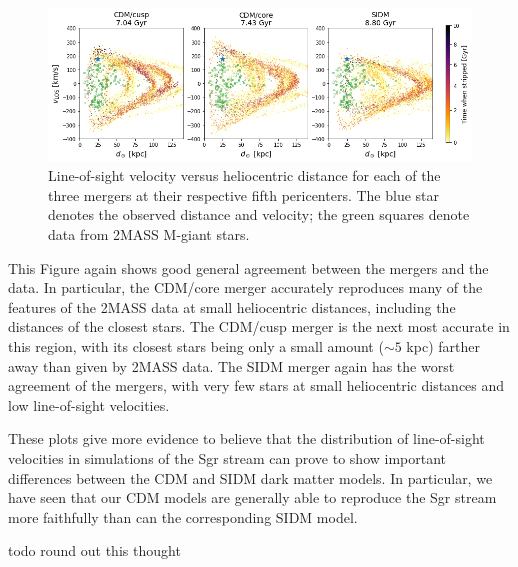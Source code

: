 \begin{figure}
    \centering
    \includegraphics[width=1.0\linewidth]{figs/vel_v_dist_2mass.png}
    \caption{%
        Line-of-sight velocity versus heliocentric distance for each of the
        three mergers at their respective fifth pericenters. The blue star
        denotes the observed distance and velocity; the green squares denote
        data from 2MASS M-giant stars. 
    }
    \label{fig:vel_v_d_2mass}
\end{figure}

This Figure again shows good general agreement between the mergers and the
data.  In particular, the CDM/core merger accurately reproduces many of the
features of the 2MASS data at small heliocentric distances, including the
distances of the closest stars.  The CDM/cusp merger is the next most accurate
in this region, with its closest stars being only a small amount ($\sim 5$
kpc) farther away than given by 2MASS data.  The SIDM merger again has the
worst agreement of the mergers, with very few stars at small heliocentric
distances and low line-of-sight velocities.

These plots give more evidence to believe that the distribution of
line-of-sight velocities in simulations of the Sgr stream can prove to show
important differences between the CDM and SIDM dark matter models. In
particular, we have seen that our CDM models are generally able to reproduce
the Sgr stream more faithfully than can the corresponding SIDM model.

todo round out this thought



